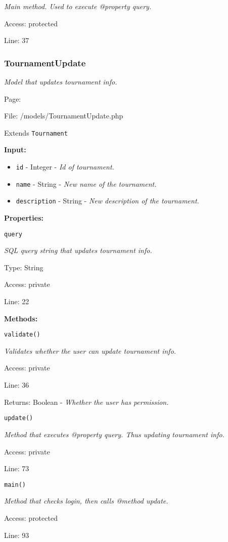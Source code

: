 {\scriptsize
\textit{Main method.
Used to execute @property query.}

Access: protected

Line: 37

}

\subsubsection{TournamentUpdate}\label{TournamentUpdate.php.doc}
\textit{Model that updates tournament info.}

Page: \pageref{TournamentUpdate.php}

File: /models/TournamentUpdate.php

Extends \texttt{Tournament}

\textbf{Input:}
\begin{itemize}
\item \texttt{id} - Integer - \textit{Id of tournament.}
\item \texttt{name} - String - \textit{New name of the tournament.}
\item \texttt{description} - String - \textit{New description of the tournament.}
\end{itemize}

\textbf{Properties:}

\texttt{query}

{\scriptsize
\textit{SQL query string that updates tournament info.}

Type: String

Access: private

Line: 22

}
\textbf{Methods:}

\texttt{validate()}

{\scriptsize
\textit{Validates whether the user can update tournament info.}

Access: private

Line: 36

Returns: Boolean - \textit{Whether the user has permission.}

}

\texttt{update()}

{\scriptsize
\textit{Method that executes @property query.
Thus updating tournament info.}

Access: private

Line: 73

}

\texttt{main()}

{\scriptsize
\textit{Method that checks login, then calls @method update.}

Access: protected

Line: 93

}

